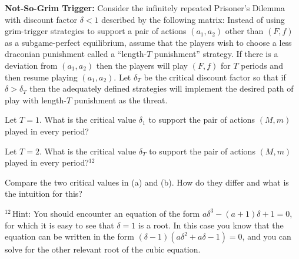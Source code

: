 \textbf{Not-So-Grim Trigger:} Consider the infinitely repeated Prisoner's Dilemma with
discount factor $\delta < 1$ described by the following matrix:
Instead of using grim-trigger strategies to support a pair of actions $(a_1, a_2)$ other than
$(F, f)$ as a subgame-perfect equilibrium, assume that the players wish to choose a less draconian
punishment called a ``length-$T$ punishment'' strategy. If there is a deviation from $(a_1, a_2)$
then the players will play $(F, f)$ for $T$ periods and then resume playing $(a_1, a_2)$. Let
$\delta_T$ be the critical discount factor so that if $\delta > \delta_T$ then the adequately
defined strategies will implement the desired path of play with length-$T$ punishment as the
threat.
\begin{partes}
\item Let $T = 1$. What is the critical value $\delta_1$ to support the pair of actions $(M, m)$
played in every period?
\item Let $T = 2$. What is the critical value $\delta_T$ to support the pair of actions $(M, m)$
played in every period?$^{12}$
\item Compare the two critical values in (a) and (b). How do they differ and what is the intuition
for this?
\end{partes}
{\small $^{12}$\,Hint: You should encounter an equation of the form $a\delta^3 - (a + 1)\delta + 1 = 0$,
for which it is easy to see that $\delta = 1$ is a root. In this case you know that the equation can
be written in the form $(\delta - 1)(a\delta^2 + a\delta - 1) = 0$, and you can solve for the other
relevant root of the cubic equation.\par}
\resolespaco



